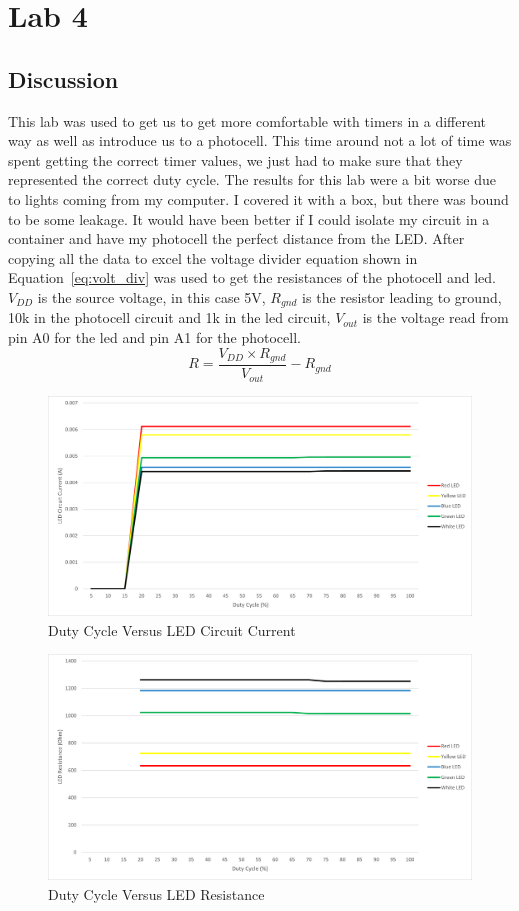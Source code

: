 \documentclass[12pt,titlepage]{article}
\begin{document}
\section{Lab 4}
\subsection{Discussion}
This lab was used to get us to get more comfortable with timers in a different way as well as introduce us
to a photocell. This time around not a lot of time was spent getting the correct timer values, we just
had to make sure that they represented the correct duty cycle. The results for this lab were a bit worse due
to lights coming from my computer. I covered it with a box, but there was bound to be some leakage.
It would have been better if I could isolate my circuit in a container and have my photocell the perfect
distance from the LED. After copying all the data to excel the voltage divider equation shown in 
Equation~\ref{eq:volt_div} was used to get the resistances of the photocell and led.
$V_{DD}$ is the source voltage, in this case 5V, $R_{gnd}$ is the resistor leading to ground, 10k in the
photocell circuit and 1k in the led circuit, $V_{out}$ is the voltage read from pin A0 for the led and pin A1
for the photocell.  
\begin{equation} \label{eq:volt_div}
  R = \frac{V_{DD} \times R_{gnd}}{V_{out}} - R_{gnd}
\end{equation}
\begin{figure}[!htb]
    \centering
    \includegraphics[width=5in]{lab_4/duty_cycle_led_circuit_curr.png}
    \caption{Duty Cycle Versus LED Circuit Current}\label{fig:duty_cycle_led_circuit_curr}
\end{figure}
\begin{figure}[!htb]
    \centering
    \includegraphics[width=5in]{lab_4/duty_cycle_led_res.png}
    \caption{Duty Cycle Versus LED Resistance}\label{fig:duty_cycle_led_res}
\end{figure}
\end{document}
